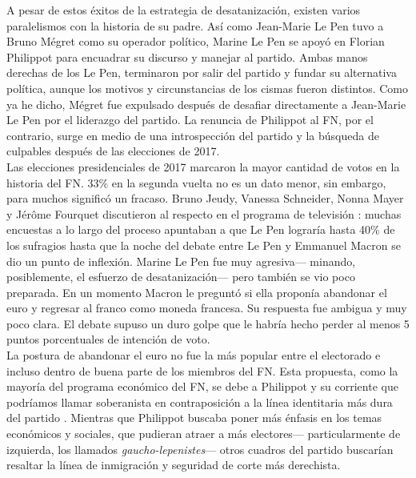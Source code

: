 A pesar de estos éxitos de la estrategia de desatanización, existen varios paralelismos con la historia de su padre. Así como Jean-Marie Le Pen tuvo a Bruno Mégret como su operador político, Marine Le Pen se apoyó en Florian Philippot para encuadrar su discurso y manejar al partido. Ambas manos derechas de los Le Pen, terminaron por salir del partido y fundar su alternativa política, aunque los motivos y circunstancias de los cismas fueron distintos. Como ya he dicho, Mégret fue expulsado después de desafiar directamente a Jean-Marie Le Pen por el liderazgo del partido. La renuncia de Philippot al FN, por el contrario, surge en medio de una introspección del partido y la búsqueda de culpables después de las elecciones de 2017.\\ 

Las elecciones presidenciales de 2017 marcaron la mayor cantidad de votos en la historia del FN. 33\% en la segunda vuelta no es un dato menor, sin embargo, para muchos significó un fracaso. Bruno Jeudy, Vanessa Schneider, Nonna Mayer y Jérôme Fourquet discutieron al respecto en el programa de televisión \textit{\textcite{CDansLAir17}}: muchas encuestas a lo largo del proceso apuntaban a que Le Pen lograría hasta 40\% de los sufragios hasta que la noche del debate entre Le Pen y Emmanuel Macron se dio un punto de inflexión. Marine Le Pen fue muy agresiva--- minando, posiblemente, el esfuerzo de desatanización--- pero también se vio poco preparada. En un momento Macron le preguntó si ella proponía abandonar el euro y regresar al franco como moneda francesa. Su respuesta fue ambigua y muy poco clara. El debate supuso un duro golpe que le habría hecho perder al menos 5 puntos porcentuales de intención de voto.\\

La postura de abandonar el euro no fue la más popular entre el electorado e incluso dentro de buena parte de los miembros del FN. Esta propuesta, como la mayoría del programa económico del FN, se debe a Philippot y su corriente que podríamos llamar soberanista en contraposición a la línea identitaria más dura del partido \parencites{Marin17}{Berteloot17}{Europe17}. Mientras que Philippot buscaba poner más énfasis en los temas económicos y sociales, que pudieran atraer a más electores--- particularmente de izquierda, los llamados \textit{gaucho-lepenistes}--- otros cuadros del partido buscarían resaltar la línea de inmigración y seguridad de corte más derechista.\\ 

